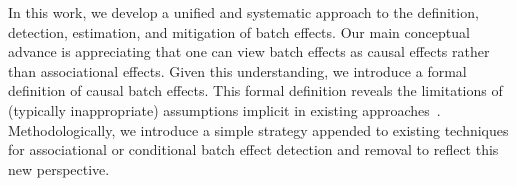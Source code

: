 % 
% 


In this work, we develop a unified and systematic approach to the definition, detection, estimation, and mitigation of  batch effects. Our main conceptual advance is appreciating that one can view batch effects as causal effects rather than associational effects.  Given this understanding, we introduce a formal definition of causal batch effects. This formal definition reveals the limitations of (typically inappropriate) assumptions implicit in existing approaches~\cite{Rosenbaum1983Apr,Rosenbaum1985,Stuart2010Feb}. Methodologically, we introduce a simple strategy appended to existing techniques for associational or conditional batch effect detection and removal to reflect this new perspective. 

